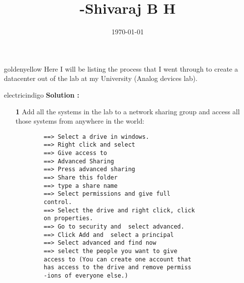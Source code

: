 \documentclass[12pt]{article}
\begin{document}
	\title{
		\fontsize{16}{24}\bfseries
	-Shivaraj B H
	}
	\date{\today}
	\maketitle



	
	\begin{mybox}{goldenyellow}{}		
		Here I will be listing the process that I went through to create a datacenter out of the lab at my University (Analog devices lab).	
	\end{mybox}


\vspace{0.3cm}				
			
\begin{mybox}{electricindigo}{}
	\textbf{Solution :} 
	\begin{itemize}
		\item[\textbf{1}] Add all the systems in the lab to a network sharing group and access all those systems from anywhere in the world: 
		\begin{lstlisting}
		==> Select a drive in windows.
		==> Right click and select 
		==> Give access to 
		==> Advanced Sharing
		==> Press advanced sharing 
		==> Share this folder 
		==> type a share name 
		==> Select permissions and give full 
		control.
		==> Select the drive and right click, click 
		on properties. 
		==> Go to security and  select advanced.
		==> Click Add and  select a principal 
		==> Select advanced and find now 
		==> select the people you want to give
		access to (You can create one account that
		has access to the drive and remove permiss
		-ions of everyone else.) 
		\end{lstlisting}
		
	\end{itemize}
	
	

\end{mybox}
\end{document}
